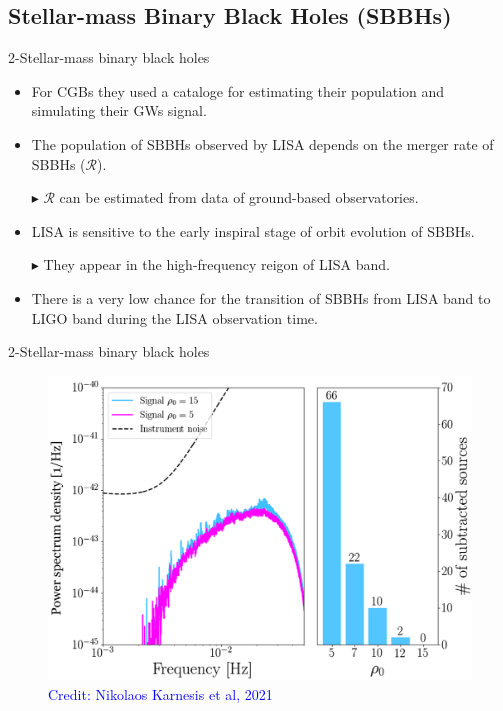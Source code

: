 \documentclass[pdf]{beamer}
\newcommand{\credit}[1]{\tiny{\textcolor{blue}{Credit: #1}}}
\begin{document}
\subsection{Stellar-mass Binary Black Holes (SBBHs)}
\begin{frame}{2-Stellar-mass binary black holes}
\begin{itemize}
\item For CGBs they used a cataloge for estimating their population and simulating their GWs signal. 
\item The population of SBBHs observed by LISA depends on the merger rate of SBBHs ($\mathcal{R}$).
\item[$\blacktriangleright$] $\mathcal{R}$ can be estimated from data of ground-based observatories.
\item LISA is sensitive to the early inspiral stage of orbit evolution of SBBHs.
\item[$\blacktriangleright$] They appear in the high-frequency reigon of LISA band.
\item There is a very low chance for the transition of SBBHs from LISA band to LIGO band during the LISA observation time.
\end{itemize}
\end{frame}
%

\begin{frame}{2-Stellar-mass binary black holes}
\begin{figure}
\includegraphics[width=.8\textwidth]{fig/SMBHs.png}
\caption*{\credit{Nikolaos Karnesis et al, 2021}}
\end{figure}
\end{frame}
\end{document}
